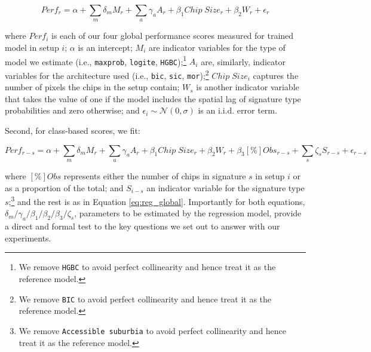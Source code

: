 \begin{equation}
        Perf_r = \alpha +
        \sum_m \delta_m M_r +
        \sum_a \gamma_a A_r +
        \beta_1 Chip \; Size_r +
        \beta_2 W_r +
        \epsilon_r
        \label{eq:reg_global}
\end{equation}


where $Perf_i$ is each of our four global performance scores measured for trained
model in setup $i$; $\alpha$ is an intercept; $M_i$ are indicator variables for the
type of model we estimate (i.e., \texttt{maxprob}, \texttt{logite},
\texttt{HGBC});\footnote{We remove \texttt{HGBC} to avoid perfect
collinearity and hence treat it as the reference model.} $A_i$ are,
similarly, indicator variables for the architecture used (i.e.,
\texttt{bic}, \texttt{sic}, \texttt{mor});\footnote{We remove \texttt{BIC} to avoid perfect
collinearity and hence treat it as the reference model.} $Chip \; Size_i$
captures the number of pixels the chips in the setup contain; $W_s$ is another
indicator variable that takes the value of one if the model includes the
spatial lag of signature type probabilities and zero otherwise;
and $\epsilon_i \sim \mathcal{N}(0, \sigma)$ is an i.i.d. error term.

Second, for class-based scores, we fit:

\begin{equation}
        Perf_{r-s} = \alpha +
        \sum_m \delta_m M_r +
        \sum_a \gamma_a A_r +
        \beta_1 Chip \; Size_r +
        \beta_2 W_r +
        \beta_3 \left[\%\right]Obs_{r-s} +
        \sum_s \zeta_s S_{r-s} +
        \epsilon_{r-s}
        \label{eq:reg_class}
\end{equation}

where $\left[\%\right]Obs$ represents either the number of chips in
signature $s$ in setup $i$ or as a proportion of the total; and $S_{i-s}$ an
indicator variable for the signature type $s$;\footnote{We remove
\texttt{Accessible suburbia} to avoid perfect collinearity and hence treat it
as the reference model.} and the rest is as in Equation \ref{eq:reg_global}.
%
Importantly for both equations,
$\delta_m/\gamma_a/\beta_1/\beta_2/\beta_3/\zeta_s$, parameters to be
estimated by the regression model, provide a direct and formal test to the key
questions we set out to answer with our experiments.